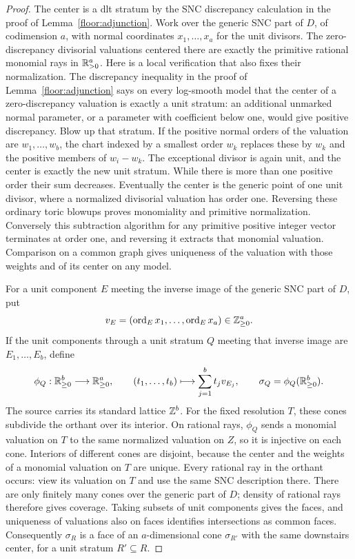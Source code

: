 \begin{proof}
The center is a dlt stratum by the SNC discrepancy calculation in the
proof of Lemma~\ref{floor:adjunction}.  Work over the generic SNC part of \(D\),
of codimension \(a\), with normal coordinates \(x_1,\ldots,x_a\) for
the unit divisors.  The zero-discrepancy divisorial valuations centered
there are exactly the primitive rational monomial rays in
\(\mathbb R_{>0}^a\).  Here is a local verification that also fixes their
normalization.  The discrepancy inequality in the proof of
Lemma~\ref{floor:adjunction} says on every log-smooth model that the center
of a zero-discrepancy valuation is exactly a unit stratum: an additional
unmarked normal parameter, or a parameter with coefficient below one, would
give positive discrepancy.  Blow up that stratum.  If the positive normal
orders of the valuation are \(w_1,\ldots,w_b\), the chart indexed by a
smallest order \(w_k\) replaces these by \(w_k\) and the positive members
of \(w_i-w_k\).  The exceptional divisor is again unit, and the center
is exactly the new unit stratum.  While there is more than one positive
order their sum decreases.  Eventually the center is the generic point of
one unit divisor, where a normalized divisorial valuation has order one.
Reversing these ordinary toric blowups proves monomiality and primitive
normalization.  Conversely this subtraction algorithm for any primitive
positive integer vector terminates at order one, and reversing it extracts
that monomial valuation.  Comparison on a common graph gives uniqueness
of the valuation with those weights and of its center on any model.

For a unit component \(E\) meeting the inverse image of the generic SNC
part of \(D\), put
\[
 v_E=(\operatorname{ord}_E x_1,\ldots,\operatorname{ord}_E x_a)\in\mathbb Z_{\geq0}^a.
\]
If the unit components through a unit stratum \(Q\) meeting that inverse image are
\(E_1,\ldots,E_b\), define
\[
 \phi_Q:\mathbb R_{\geq0}^b\longrightarrow\mathbb R_{\geq0}^a,\qquad
 (t_1,\ldots,t_b)\longmapsto\sum_{j=1}^b t_jv_{E_j},
 \qquad \sigma_Q=\phi_Q(\mathbb R_{\geq0}^b).
\]
The source carries its standard lattice \(\mathbb Z^b\).  For the fixed
resolution \(T\), these cones subdivide the orthant over its interior.
On rational rays, \(\phi_Q\) sends a
monomial valuation on \(T\) to the same normalized valuation on \(Z\),
so it is injective on each cone.  Interiors of different cones are
disjoint, because the center and the weights of a monomial valuation on
\(T\) are unique.  Every rational ray in the orthant occurs: view its
valuation on \(T\) and use the same SNC description there.  There are
only finitely many cones over the generic part of \(D\); density of
rational rays therefore gives coverage.  Taking subsets of unit components
gives the faces, and uniqueness of valuations also on faces identifies
intersections as common faces.  Consequently \(\sigma_R\) is a face
of an \(a\)-dimensional cone \(\sigma_{R'}\) with the same downstairs
center, for a unit stratum \(R'\subseteq R\).


\end{proof}
